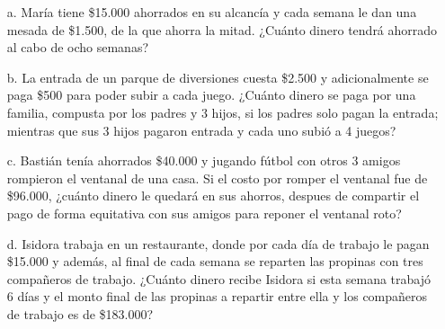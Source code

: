\documentclass[spanish,letterpaper, 11pt, addpoints, answers]{exam}
\begin{document}
\begin{questions}
    \begin{itemize}
      \item[a.] María tiene \$15.000 ahorrados en su alcancía y cada semana le dan una mesada de \$1.500, de la que ahorra la mitad. ¿Cuánto dinero tendrá ahorrado al cabo de ocho semanas?
      \vspace{3cm}
      \item[b.] La entrada de un parque de diversiones cuesta \$2.500 y adicionalmente se paga \$500 para poder subir a cada juego. ¿Cuánto dinero se paga por una familia, compusta por los padres y 3 hijos, si los padres solo pagan la entrada; mientras que sus 3 hijos pagaron entrada y cada uno subió a 4 juegos?
      \vspace{3cm}
      \item[c.] Bastián tenía ahorrados \$40.000 y jugando fútbol con otros 3 amigos rompieron el ventanal de una casa. Si el costo por romper el ventanal fue de \$96.000, ¿cuánto dinero le quedará en sus ahorros, despues de compartir el pago de forma equitativa con sus amigos para reponer el ventanal roto?
      \vspace{3cm}
      \item[d.] Isidora trabaja en un restaurante, donde por cada día de trabajo le pagan \$15.000 y además, al final de cada semana se reparten las propinas con tres compañeros de trabajo. ¿Cuánto dinero recibe Isidora si esta semana trabajó 6 días y el monto final de las propinas a repartir entre ella y los compañeros de trabajo es de \$183.000?
    \end{itemize}

\end{questions}
\end{document}
